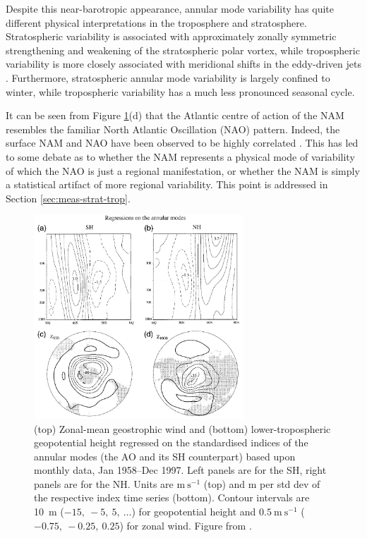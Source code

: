 Despite this near-barotropic appearance, annular mode variability has quite
different physical interpretations in the troposphere and
stratosphere. Stratospheric variability is associated with approximately zonally
symmetric strengthening and weakening of the stratospheric polar vortex, while
tropospheric variability is more closely associated with meridional shifts in
the eddy-driven jets \citep{Limpasuvan1999}. Furthermore, stratospheric annular
mode variability is largely confined to winter, while tropospheric variability
has a much less pronounced seasonal cycle.

It can be seen from Figure \ref{fig:annular_modes}(d) that the Atlantic centre
of action of the NAM resembles the familiar North Atlantic Oscillation (NAO)
pattern. Indeed, the surface NAM and NAO have been observed to be highly
correlated \citep{Ambaum2001}. This has led to some debate as to whether the NAM
represents a physical mode of variability of which the NAO is just a regional
manifestation, or whether the NAM is simply a statistical artifact of more
regional variability. This point is addressed in Section
\ref{sec:meas-strat-trop}.

\begin{figure}
 \centering
 \noindent\includegraphics[width=0.7\textwidth]{figures/chapter-intro/annular_modes_TW.png}
 \caption[Annular mode patterns from \citet{Thompson2000a}]{(top) Zonal-mean
   geostrophic wind and (bottom) lower-tropospheric geopotential height
   regressed on the standardised indices of the annular modes (the AO and its SH
   counterpart) based upon monthly data, Jan 1958--Dec 1997. Left panels are for
   the SH, right panels are for the NH. Units are $\mathrm{m~s^{-1}}$ (top) and
   m per std dev of the respective index time series (bottom). Contour intervals
   are 10~m ($-15,~-5,~5,~\dots$) for geopotential height and
   $\mathrm{0.5~m~s^{-1}}$ ($-0.75,~-0.25,~0.25$) for zonal wind. Figure from
   \citet{Thompson2000a}.}
 \label{fig:annular_modes}
\end{figure}


